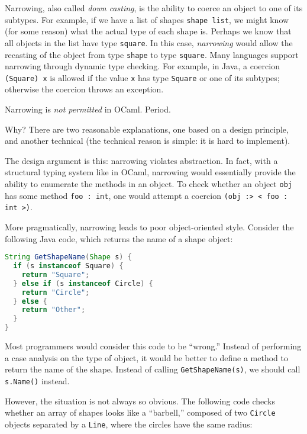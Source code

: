 Narrowing, also called \emph{down casting}, is the ability to coerce an
object to one of its subtypes. For example, if we have a list of shapes
\passthrough{\lstinline!shape list!}, we might know (for some reason)
what the actual type of each shape is. Perhaps we know that all objects
in the list have type \passthrough{\lstinline!square!}. In this case,
\emph{narrowing} would allow the recasting of the object from type
\passthrough{\lstinline!shape!} to type
\passthrough{\lstinline!square!}. Many languages support narrowing
through dynamic type checking. For example, in Java, a coercion
\passthrough{\lstinline!(Square) x!} is allowed if the value
\passthrough{\lstinline!x!} has type \passthrough{\lstinline!Square!} or
one of its subtypes; otherwise the coercion throws an exception.

Narrowing is \emph{not permitted} in OCaml. Period.

Why? There are two reasonable explanations, one based on a design
principle, and another technical (the technical reason is simple: it is
hard to implement).

The design argument is this: narrowing violates abstraction. In fact,
with a structural typing system like in OCaml, narrowing would
essentially provide the ability to enumerate the methods in an object.
To check whether an object \passthrough{\lstinline!obj!} has some method
\passthrough{\lstinline!foo : int!}, one would attempt a coercion
\passthrough{\lstinline!(obj :> < foo : int >)!}.

More pragmatically, narrowing leads to poor object-oriented style.
Consider the following Java code, which returns the name of a shape
object:

\begin{lstlisting}[language=Java]
String GetShapeName(Shape s) {
  if (s instanceof Square) {
    return "Square";
  } else if (s instanceof Circle) {
    return "Circle";
  } else {
    return "Other";
  }
}
\end{lstlisting}

Most programmers would consider this code to be ``wrong.'' Instead of
performing a case analysis on the type of object, it would be better to
define a method to return the name of the shape. Instead of calling
\passthrough{\lstinline!GetShapeName(s)!}, we should call
\passthrough{\lstinline!s.Name()!} instead.

However, the situation is not always so obvious. The following code
checks whether an array of shapes looks like a ``barbell,'' composed of
two \passthrough{\lstinline!Circle!} objects separated by a
\passthrough{\lstinline!Line!}, where the circles have the same radius:

